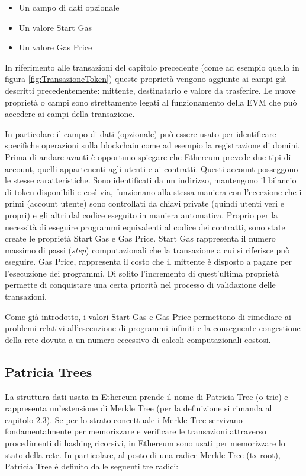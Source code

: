 \begin{itemize}
\item Un campo di dati opzionale
\item Un valore Start Gas
\item Un valore Gas Price
\end{itemize}

In riferimento alle transazioni del capitolo precedente (come ad esempio quella in figura \ref{fig:TransazioneToken}) queste proprietà vengono aggiunte ai campi già descritti precedentemente: mittente, destinatario e valore da trasferire. Le nuove proprietà o campi sono strettamente legati al funzionamento della EVM che può accedere ai campi della transazione.

In particolare il campo di dati (opzionale) può essere usato per identificare specifiche operazioni sulla blockchain come ad esempio la registrazione di domini. Prima di andare avanti è opportuno spiegare che Ethereum prevede due tipi di account, quelli appartenenti agli utenti e ai contratti. Questi account posseggono le stesse caratteristiche. Sono identificati da un indirizzo, mantengono il bilancio di token disponibili e così via, funzionano alla stessa maniera con l’eccezione che i primi (account utente) sono controllati da chiavi private (quindi utenti veri e propri) e gli altri dal codice eseguito in maniera automatica. Proprio per la necessità di eseguire programmi equivalenti al codice dei contratti, sono state create le proprietà Start Gas e Gas Price. Start Gas rappresenta il numero massimo di passi (\emph{step}) computazionali che la transazione a cui si riferisce può eseguire. Gas Price, rappresenta il costo che il mittente è disposto a pagare per l’esecuzione dei programmi. Di solito l’incremento di quest’ultima proprietà permette di conquistare una certa priorità nel processo di validazione delle transazioni.

Come già introdotto, i valori Start Gas e Gas Price permettono di rimediare ai problemi relativi all'esecuzione di programmi infiniti e la conseguente congestione della rete dovuta a un numero eccessivo di calcoli computazionali costosi.

\subsection{Patricia Trees}

La struttura dati usata in Ethereum prende il nome di Patricia Tree (o trie) e rappresenta un’estensione di Merkle Tree (per la definizione si rimanda al capitolo 2.3). Se per lo strato concettuale i Merkle Tree servivano fondamentalmente per memorizzare e verificare le transazioni attraverso procedimenti di hashing ricorsivi, in Ethereum sono usati per memorizzare lo stato della rete. In particolare, al posto di una radice Merkle Tree (tx root), Patricia Tree è definito dalle seguenti tre radici:

